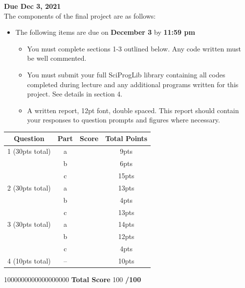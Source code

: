 \documentclass[11pt]{article}
\begin{document}
\raggedright
\newcommand\Page{\page  / \lastPage}
\newcommand\page{1}
\newcommand\qN[2]{\Large {#1} \small{#2} \normalsize}

\newcommand\dueDate{\today}
\newcommand\hwnum{6}
\newcommand\ExNum{}

\newcommand\lastPage{3}


\centering
\textbf{Due Dec 3, 2021}\\
\hrulefill
\flushleft
\vspace{1cm}
The components of the final project are as follows:
\begin{itemize}
	\item The following items are due on \textbf{December 3} by \textbf{11:59 pm}
	\begin{itemize}
		\item You must complete sections 1-3 outlined below. Any code written must be well commented.
		\item You must submit your full SciProgLib library containing all codes completed during lecture and any additional programs written for this project. See details in section 4.
		\item A written report, 12pt font, double spaced. This report should contain your responses to question prompts and figures where necessary.		
	\end{itemize}
\end{itemize}

\begin{table}[H]
	\centering
	\color{red}
	\begin{tabular}{| c | c| c | c|}
		\hline
		Question & Part & Score & Total Points \\
		\hline
		1 (30pts total) & a & & 9pts \\
		                & b & & 6pts \\
		                & c & & 15pts \\
		\hline
		2 (30pts total) & a & & 13pts \\
						& b & & 4pts \\
						& c & & 13pts \\
		\hline
		3 (30pts total) & a & & 14pts \\
						& b & & 12pts \\
						& c & & 4pts \\
	   \hline
	   4 (10pts total) & -- & &  10pts\\
	   \hline
	\end{tabular}
\end{table}
\centering \color{white} 1000000000000000000 \color{red}\textbf{Total Score} \color{white} 100 \color{red} \textbf{/100} \color{black}
\end{document}
